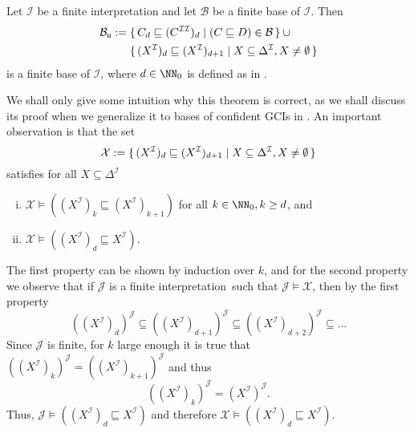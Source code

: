 \begin{Theorem}
  \label{thm:unravelling-ELgfpbot-bases}
  Let $\mathcal{I}$ be a finite interpretation and let $\mathcal{B}$ be a finite \ELgfpbot
  base of $\mathcal{I}$.  Then
  \begin{align*}
    \mathcal{B}_{\mathsf{u}} &:= \set{ C_d \sqsubseteq (C^{\mathcal{I}\mathcal{I}})_d \mid (C
      \sqsubseteq D) \in \mathcal{B} } \cup {} \\
    &\phantom{{}:={}} \set{ (X^{\mathcal{I}})_d \sqsubseteq (X^{\mathcal{I}})_{d+1} \mid X
      \subseteq \Delta^{\mathcal{I}}, X \neq \emptyset }
  \end{align*}
  is a finite \ELbot base of $\mathcal{I}$, where $d \in \NN_0$ is defined as in
  .
\end{Theorem}

We shall only give some intuition why this theorem is correct, as we shall discuss its
proof when we generalize it to bases of confident GCIs in .
An important observation is that the set
\begin{equation*}
  \mathcal{X} := {\{\, (X^{\mathcal{I}})_d \sqsubseteq (X^{\mathcal{I}})_{d+1} \mid X
    \subseteq \Delta^{\mathcal{I}}, X \neq \emptyset \,\}}
\end{equation*}
satisfies for all $X \subseteq \Delta^{\mathcal{I}}$
\begin{enumerate}[i. ]
\item $\mathcal{X} \models ( (X^{\mathcal{I}})_k \sqsubseteq (X^{\mathcal{I}})_{k+1} )$
  for all $k \in \NN_0, k \geq d$, and
\item $\mathcal{X} \models ( (X^{\mathcal{I}})_d \sqsubseteq X^{\mathcal{I}} )$.
\end{enumerate}
The first property can be shown by induction over $k$, and for the second property we
observe that if $\mathcal{J}$ is a finite interpretation\ such that $\mathcal{J} \models \mathcal{X}$, then by the first
property
\begin{equation*}
  ((X^{\mathcal{I}})_d)^{\mathcal{J}} \subseteq ((X^{\mathcal{I}})_{d+1})^{\mathcal{J}}
  \subseteq ((X^{\mathcal{I}})_{d+2})^{\mathcal{J}} \subseteq \dots
\end{equation*}
Since $\mathcal{J}$ is finite, for $k$ large enough it is true that
$((X^{\mathcal{I}})_k)^{\mathcal{J}} = ((X^{\mathcal{I}})_{k+1})^{\mathcal{J}}$ and thus
\begin{equation*}
  ((X^{\mathcal{I}})_k)^{\mathcal{J}} = (X^{\mathcal{I}})^{\mathcal{J}}.
\end{equation*}
Thus, $\mathcal{J} \models ( (X^{\mathcal{I}})_d \sqsubseteq X^{\mathcal{I}} )$ and
therefore $\mathcal{X} \models ( (X^{\mathcal{I}})_d \sqsubseteq X^{\mathcal{I}} )$.

